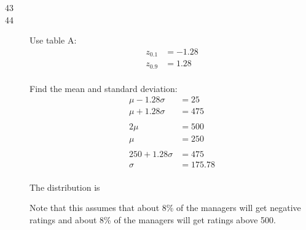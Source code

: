 \documentclass{exam}
\begin{document}
\begin{description}
      \item[43]

      \item[44]
        Use table A: 
        \begin{align*}
          z_{0.1} &= -1.28 \\
          z_{0.9} &= 1.28 \\
        \end{align*}

        Find the mean and standard deviation:
        \begin{align*}
          \mu - 1.28 \sigma &= 25 \\
          \mu + 1.28 \sigma &= 475 \\
          \\
          2 \mu & = 500 \\
          \mu   & = 250 \\
          \\
          250 + 1.28 \sigma & = 475 \\
          \sigma            & = 175.78 \\
        \end{align*}

        The distribution is 

        Note that this assumes that about 8\% of the managers will get negative
        ratings and about 8\% of the managers will get ratings above 500.

    \end{description}
\end{document}
